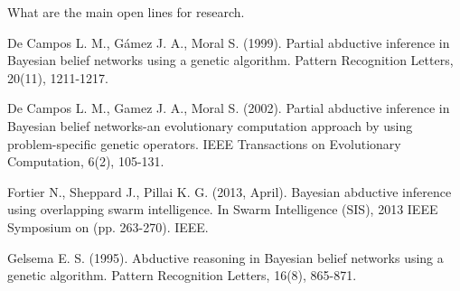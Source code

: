 \documentclass[a4paper,11pt]{article}
\begin{document}
What are the main open lines for research.




\begin{thebibliography}{}

De Campos L. M., Gámez J. A., Moral S. (1999). Partial abductive inference in Bayesian belief networks using a genetic algorithm. Pattern Recognition Letters, 20(11), 1211-1217.

De Campos L. M., Gamez J. A., Moral S. (2002). Partial abductive inference in Bayesian belief networks-an evolutionary computation approach by using problem-specific genetic operators. IEEE Transactions on Evolutionary Computation, 6(2), 105-131.

Fortier N., Sheppard J., Pillai K. G. (2013, April). Bayesian abductive inference using overlapping swarm intelligence. In Swarm Intelligence (SIS), 2013 IEEE Symposium on (pp. 263-270). IEEE.

Gelsema E. S. (1995). Abductive reasoning in Bayesian belief networks using a genetic algorithm. Pattern Recognition Letters, 16(8), 865-871.

\end{thebibliography}
\end{document}
